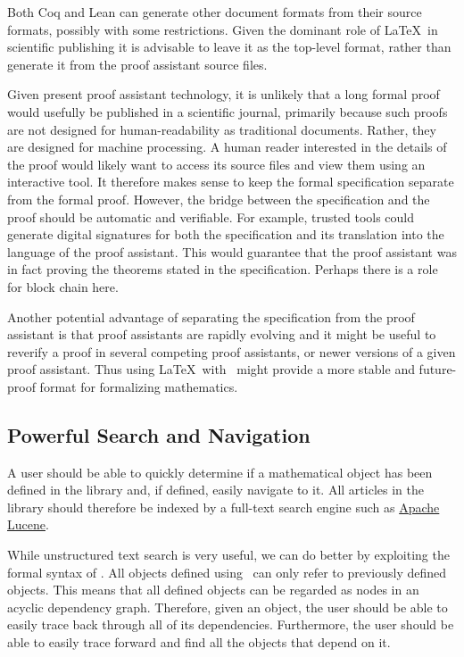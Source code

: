 \documentclass{amsart}
\begin{document}
Both Coq and Lean can generate other document formats from their source formats, possibly with some restrictions.
Given the dominant role of \LaTeX\ in scientific publishing it is advisable to leave it as the top-level format,
rather than generate it from the proof assistant source files.

Given present proof assistant technology, it is unlikely that a long formal proof would usefully be published in a scientific journal, 
primarily because such proofs are not designed for human-readability as traditional documents. 
Rather, they are designed for machine processing.
A human reader interested in the details of the proof would likely want to access its source files and view them using an interactive tool.
It therefore makes sense to keep the formal specification separate from the formal proof.
However, the bridge between the specification and the proof should be automatic and verifiable.
For example, trusted tools could generate digital signatures for both the specification and its translation into the language of
the proof assistant. This would guarantee that the proof assistant was in fact proving the theorems stated in the specification.
Perhaps there is a role for block chain here.

Another potential advantage of separating the specification from the proof assistant is that proof assistants are rapidly evolving and it
might be useful to reverify a proof in several competing proof assistants, or newer versions of a given proof assistant. 
Thus using \LaTeX\ with \ZN\ might provide a more stable and future-proof format for formalizing mathematics.

 \hypertarget{powerful-search-and-navigation}{}
 \subsection{Powerful Search and Navigation}
 
 A user should be able to quickly determine if a mathematical object has been defined in the library and, if defined,
 easily navigate to it.
 All articles in the library should therefore be indexed by a full-text search engine such as \href{https://lucene.apache.org}{Apache Lucene}.
 
 While unstructured text search is very useful, we can do better by exploiting the formal syntax of \ZN.
 All objects defined using \ZN\ can only refer to previously defined objects.
 This means that all defined objects can be regarded as nodes in an acyclic dependency graph.
 Therefore, given an object, the user should be able to easily trace back through all of its dependencies.
 Furthermore, the user should be able to easily trace forward and find all the objects that depend on it.
 
\end{document}
